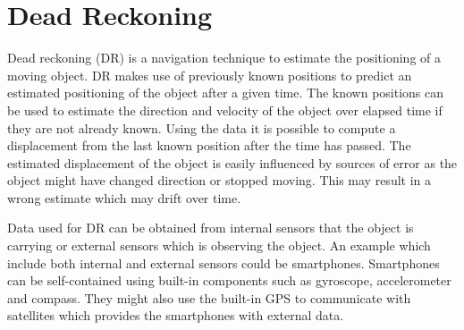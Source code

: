 \section{Dead Reckoning}
Dead reckoning (DR) \cite{DR} is a navigation technique to estimate the positioning of a moving object.
DR makes use of previously known positions to predict an estimated positioning of the object after a given time.
The known positions can be used to estimate the direction and velocity of the object over elapsed time if they are not already known.
Using the data it is possible to compute a displacement from the last known position after the time has passed.
The estimated displacement of the object is easily influenced by sources of error as the object might have changed direction or stopped moving.
This may result in a wrong estimate which may drift over time.

Data used for DR can be obtained from internal sensors that the object is carrying or external sensors which is observing the object.
An example which include both internal and external sensors could be smartphones.
Smartphones can be self-contained using built-in components such as gyroscope, accelerometer and compass.
They might also use the built-in GPS to communicate with satellites which provides the smartphones with external data.